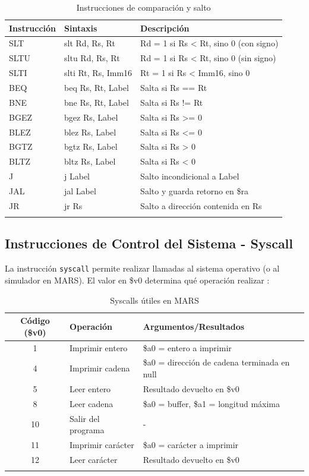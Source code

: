 \documentclass[12pt]{article}
\begin{document}
\begin{longtable}{|l|l|l|}
    \hline
    \textbf{Instrucción} & \textbf{Sintaxis} & \textbf{Descripción} \\
    \hline
    SLT & slt Rd, Rs, Rt & Rd = 1 si Rs < Rt, sino 0 (con signo) \\
    \hline
    SLTU & sltu Rd, Rs, Rt & Rd = 1 si Rs < Rt, sino 0 (sin signo) \\
    \hline
    SLTI & slti Rt, Rs, Imm16 & Rt = 1 si Rs < Imm16, sino 0 \\
    \hline
    BEQ & beq Rs, Rt, Label & Salta si Rs == Rt \\
    \hline
    BNE & bne Rs, Rt, Label & Salta si Rs != Rt \\
    \hline
    BGEZ & bgez Rs, Label & Salta si Rs >= 0 \\
    \hline
    BLEZ & blez Rs, Label & Salta si Rs <= 0 \\
    \hline
    BGTZ & bgtz Rs, Label & Salta si Rs > 0 \\
    \hline
    BLTZ & bltz Rs, Label & Salta si Rs < 0 \\
    \hline
    J & j Label & Salto incondicional a Label \\
    \hline
    JAL & jal Label & Salto y guarda retorno en \$ra \\
    \hline
    JR & jr Rs & Salto a dirección contenida en Rs \\
    \hline
    \caption{Instrucciones de comparación y salto}
\end{longtable}

\subsection{Instrucciones de Control del Sistema - Syscall}

La instrucción \texttt{syscall} permite realizar llamadas al sistema operativo (o al simulador en MARS). El valor en \$v0 determina qué operación realizar \cite{mipsguide}:

\begin{longtable}{|c|l|l|}
    \hline
    \textbf{Código (\$v0)} & \textbf{Operación} & \textbf{Argumentos/Resultados} \\
    \hline
    1 & Imprimir entero & \$a0 = entero a imprimir \\
    \hline
    4 & Imprimir cadena & \$a0 = dirección de cadena terminada en null \\
    \hline
    5 & Leer entero & Resultado devuelto en \$v0 \\
    \hline
    8 & Leer cadena & \$a0 = buffer, \$a1 = longitud máxima \\
    \hline
    10 & Salir del programa & - \\
    \hline
    11 & Imprimir carácter & \$a0 = carácter a imprimir \\
    \hline
    12 & Leer carácter & Resultado devuelto en \$v0 \\
    \hline
    \caption{Syscalls útiles en MARS}
\end{longtable}
\end{document}
